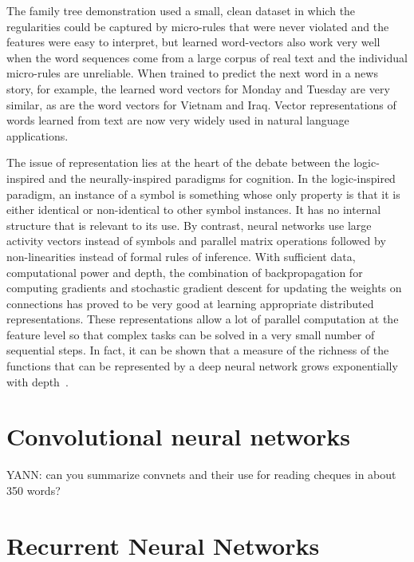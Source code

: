 \documentclass[]{article}
\begin{document}
The family tree demonstration used a small, clean dataset in which the
regularities could be captured by micro-rules that were never violated and
the features were easy to interpret, but learned word-vectors also work
very well when the word sequences come from a large corpus of real text and
the individual micro-rules are unreliable\cite{BenDucVin01-short}. When trained to
predict the next word in a news story, for example, the learned word
vectors for Monday and Tuesday are very similar, as are the word vectors
for Vietnam and Iraq.  Vector representations of words learned from text
are now very widely used in natural language applications\cite{Collobert,
  Mikolov, Socher?}.

The issue of representation lies at the heart of the debate between the
logic-inspired and the neurally-inspired paradigms for cognition. In the
logic-inspired paradigm, an instance of a symbol is something whose only
property is that it is either identical or non-identical to other symbol
instances. It has no internal structure that is relevant to its use. By
contrast, neural networks use large activity vectors instead of symbols and
parallel matrix operations followed by non-linearities instead of formal
rules of inference. With sufficient data, computational power and depth,
the combination of backpropagation for computing gradients and stochastic
gradient descent for updating the weights on connections has proved to be
very good at learning appropriate distributed representations. These
representations allow a lot of parallel computation at the feature level so
that complex tasks can be solved in a very small number of sequential
steps. In fact, it can be shown that a measure of the richness of the functions
that can be represented by a deep neural network grows exponentially
with depth~\citep{Montufar-et-al-NIPS2014}.

\section{Convolutional neural networks}


YANN: can you summarize convnets and their use for reading cheques in about
350 words?


\section{Recurrent Neural Networks}
\end{document}
